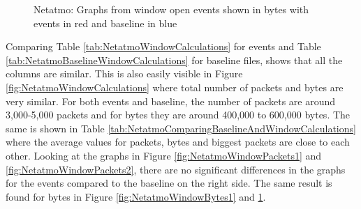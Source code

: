 \begin{figure}[H]
\begin{subfigure}[b]{0.47\textwidth}
        \centering
    \end{subfigure}
        \begin{subfigure}[b]{0.47\textwidth}
        \centering
    \end{subfigure}
    \begin{subfigure}[b]{0.47\textwidth}
        \centering
    \end{subfigure}
    \begin{subfigure}[b]{0.47\textwidth}
        \centering
    \end{subfigure}
    \hspace{0.6cm}
    \begin{subfigure}[b]{0.47\textwidth}
    \centering
        \end{subfigure}
    \caption{Netatmo: Graphs from window open events shown in bytes with events in red and baseline in blue}
    \label{fig:NetatmoWindowBytes2}
\end{figure}

Comparing Table \ref{tab:NetatmoWindowCalculations} for events and Table \ref{tab:NetatmoBaselineWindowCalculations} for baseline files, shows that all the columns are similar. This is also easily visible in Figure \ref{fig:NetatmoWindowCalculations} where total number of packets and bytes are very similar. For both events and baseline, the number of packets are around 3,000-5,000 packets and for bytes they are around 400,000 to 600,000 bytes. The same is shown in Table \ref{tab:NetatmoComparingBaselineAndWindowCalculations} where the average values for packets, bytes and biggest packets are close to each other. Looking at the graphs in Figure \ref{fig:NetatmoWindowPackets1} and \ref{fig:NetatmoWindowPackets2}, there are no significant differences in the graphs for the events compared to the baseline on the right side. The same result is found for bytes in Figure \ref{fig:NetatmoWindowBytes1} and \ref{fig:NetatmoWindowBytes2}. 

